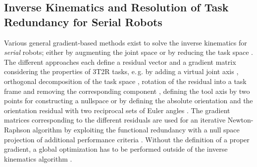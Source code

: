 \documentclass[robotics,article,submit,moreauthors,pdftex]{Definitions/mdpi}
\begin{document}
\subsection{Inverse Kinematics and Resolution of Task Redundancy for Serial Robots}

Various general gradient-based methods exist to solve the inverse kinematics for \emph{serial} robots; either by augmenting the joint space \cite{Baron2000} or by reducing the task space \cite{HuoBar2005,LegerAng2016,Zlajpah2017,1_SchapplerTapOrt2019}.
The different approaches each define a residual vector and a gradient matrix considering the properties of 3T2R tasks, e.\,g. by adding a virtual joint axis \cite{Baron2000}, orthogonal decomposition of the task space \cite{HuoBar2005}, rotation of the residual into a task frame and removing the corresponding component \cite{Zlajpah2017}, defining the tool axis by two points for constructing a nullspace \cite{LegerAng2016} or by defining the absolute orientation and the orientation residual with two reciprocal sets of Euler angles \cite{1_SchapplerTapOrt2019}.
The gradient matrices corresponding to the different residuals are used for an iterative Newton-Raphson algorithm \cite{Yoshikawa1984,GoldenbergBenFen1985} by exploiting the functional redundancy with a null space projection of additional performance criteria \cite{Yoshikawa1984}.
Without the definition of a proper gradient, a global optimization has to be performed outside of the inverse kinematics algorithm \cite{ZhuQuCaoYan2013,GuoDonKe2015}.
\end{document}
